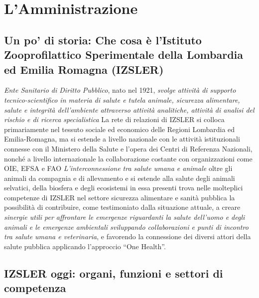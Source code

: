 \documentclass[
  12pt,
]{article}
\begin{document}
\hypertarget{lamministrazione}{%
\section{L'Amministrazione}\label{lamministrazione}}

\hypertarget{un-po-di-storia-che-cosa-uxe8-listituto-zooprofilattico-sperimentale-della-lombardia-ed-emilia-romagna-izsler}{%
\subsection{Un po' di storia: Che cosa è l'Istituto Zooprofilattico
Sperimentale della Lombardia ed Emilia Romagna
(IZSLER)}\label{un-po-di-storia-che-cosa-uxe8-listituto-zooprofilattico-sperimentale-della-lombardia-ed-emilia-romagna-izsler}}

\emph{Ente Sanitario di Diritto Pubblico}, nato nel 1921, \emph{svolge
attività di supporto tecnico-scientifico in materia di salute e tutela
animale, sicurezza alimentare, salute e integrità dell'ambiente
attraverso attività analitiche, attività di analisi del rischio e di
ricerca specialistica} La rete di relazioni di IZSLER si colloca
primariamente nel tessuto sociale ed economico delle Regioni Lombardia
ed Emilia-Romagna, ma si estende a livello nazionale con le attività
istituzionali connesse con il Ministero della Salute e l'opera dei
Centri di Referenza Nazionali, nonché a livello internazionale la
collaborazione costante con organizzazioni come OIE, EFSA e FAO
\emph{L'interconnessione tra salute umana e animale} oltre gli animali
da compagnia e di allevamento e si estende alla salute degli animali
selvatici, della biosfera e degli ecosistemi in essa presenti trova
nelle molteplici competenze di IZSLER nel settore sicurezza alimentare e
sanità pubblica la possibilità di contribuire, come testimoniato dalla
situazione attuale, a creare \emph{sinergie utili per affrontare le
emergenze riguardanti la salute dell'uomo e degli animali e le emergenze
ambientali sviluppando collaborazioni e punti di incontro tra salute
umana e veterinaria}, e favorendo la connessione dei diversi attori
della salute pubblica applicando l'approccio ``One Health''.

\hypertarget{izsler-oggi-organi-funzioni-e-settori-di-competenza}{%
\subsection{IZSLER oggi: organi, funzioni e settori di
competenza}\label{izsler-oggi-organi-funzioni-e-settori-di-competenza}}
\end{document}
